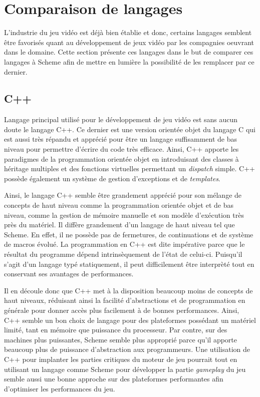 \documentclass[12pt,oneside,letterpaper,francais]{book}
\begin{document}
\section{Comparaison de langages}

L'industrie du jeu vidéo est déjà bien établie et donc, certains
langages semblent être favorisés quant au développement de jeux vidéo
par les compagnies oeuvrant dans le domaine. Cette section présente
ces langages dans le but de comparer ces langages à Scheme afin de
mettre en lumière la possibilité de les remplacer par ce dernier.

\subsection{C++}
Langage principal utilisé pour le développement de jeu vidéo est sans
aucun doute le langage C++. Ce dernier est une version orientée objet
du langage C qui est aussi très répandu et apprécié pour être un
langage suffisamment de bas niveau pour permettre d'écrire du code
très efficace. Ainsi, C++ apporte les paradigmes de la programmation
orientée objet en introduisant des classes à héritage multiples et des
fonctions virtuelles permettant un \textit{dispatch} simple. C++
possède également un système de gestion d'exceptions et de
\textit{templates}. 

Ainsi, le langage C++ semble être grandement apprécié pour son mélange
de concepts de haut niveau comme la programmation orientée objet et de
bas niveau, comme la gestion de mémoire manuelle et son modèle
d'exécution très près du matériel. Il diffère grandement d'un langage
de haut niveau tel que Scheme. En effet, il ne possède pas de
fermetures, de continuations et de système de macros évolué. La
programmation en C++ est dite impérative parce que le résultat du
programme dépend intrinsèquement de l'état de celui-ci. Puisqu'il
s'agit d'un langage typé statiquement, il peut difficilement être
interprèté tout en conservant ses avantages de performances.

Il en découle donc que C++ met à la disposition beaucoup moins de
concepts de haut niveaux, réduisant ainsi la facilité d'abstractions
et de programmation en générale pour donner accès plus facilement à de
bonnes performances. Ainsi, C++ semble un bon choix de langage pour
des plateformes possédant un matériel limité, tant en mémoire que
puissance du processeur. Par contre, sur des machines plus puissantes,
Scheme semble plus approprié parce qu'il apporte beaucoup plus de
puissance d'abstraction aux programmeurs. Une utilisation de C++ pour
implanter les parties critiques du moteur de jeu pourrait tout en
utilisant un langage comme Scheme pour développer la partie
\textit{gameplay} du jeu semble aussi une bonne approche sur des
plateformes performantes afin d'optimiser les performances du jeu.
\end{document}
